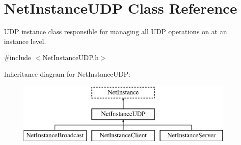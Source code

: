 \hypertarget{class_net_instance_u_d_p}{
\section{NetInstanceUDP Class Reference}
\label{class_net_instance_u_d_p}
}


UDP instance class responsible for managing all UDP operations on at an instance level.  




{\ttfamily \#include $<$NetInstanceUDP.h$>$}

Inheritance diagram for NetInstanceUDP:\begin{figure}[H]
\begin{center}
\leavevmode
\includegraphics[height=3.000000cm]{class_net_instance_u_d_p}
\end{center}
\end{figure}
